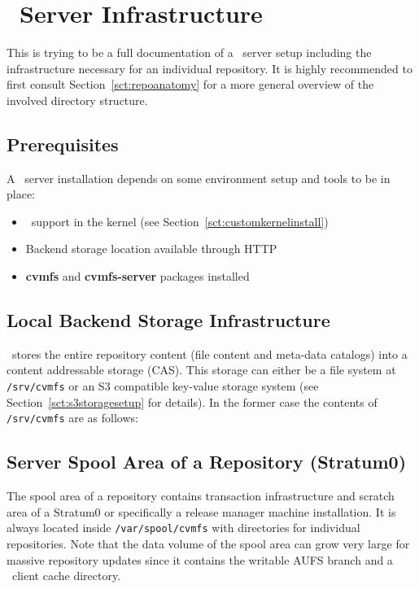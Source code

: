 \chapter{\cvmfs\ Server Infrastructure}
\label{apx:serverinfrastructure}

This is trying to be a full documentation of a \cvmfs\ server setup including the infrastructure necessary for an individual repository.
It is highly recommended to first consult Section~\ref{sct:repoanatomy} for a more general overview of the involved directory structure.

\section{Prerequisites}
A \cvmfs\ server installation depends on some environment setup and tools to be in place:
\begin{itemize}
\item \aufs\ support in the kernel (see Section~\ref{sct:customkernelinstall})
\item Backend storage location available through HTTP
\item \textbf{cvmfs} and \textbf{cvmfs-server} packages installed
\end{itemize}
\pagebreak

\section{Local Backend Storage Infrastructure}
\cvmfs\ stores the entire repository content (file content and meta-data catalogs) into a content addressable storage (CAS).
This storage can either be a file system at \texttt{/srv/cvmfs} or an S3 compatible key-value storage system (see Section~\ref{sct:s3storagesetup} for details).
In the former case the contents of \texttt{/srv/cvmfs} are as follows:

\pagebreak

\section{Server Spool Area of a Repository (Stratum0)}
The spool area of a repository contains transaction infrastructure and scratch area of a Stratum0 or specifically a release manager machine installation.
It is always located inside \texttt{/var/spool/cvmfs} with directories for individual repositories.
Note that the data volume of the spool area can grow very large for massive repository updates since it contains the writable AUFS branch and a \cvmfs\ client cache directory.

